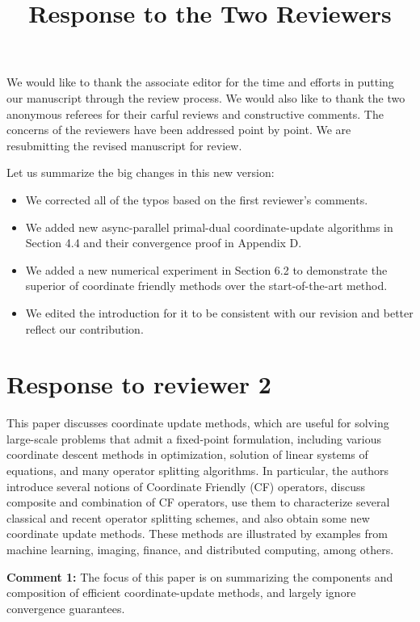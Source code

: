 \documentclass[amsa]{ipart}
\begin{document}
\title{Response to the Two Reviewers}
\vspace{5mm}

We would like to thank the associate editor for the time and efforts in putting our manuscript through the review process. We would also like to thank the two anonymous referees for their carful reviews and constructive comments. The concerns of the reviewers have been addressed point by point. We are resubmitting the revised manuscript for review. 

Let us summarize the big changes in this new version:
\begin{itemize}
\item We corrected all of the typos based on the first reviewer's comments. 
\item We added new async-parallel primal-dual coordinate-update algorithms in Section 4.4 and their convergence proof in Appendix D.
\item We added a new numerical experiment in Section 6.2 to demonstrate the superior of coordinate friendly methods over the start-of-the-art method. 
\item We edited the introduction for it to be consistent with our revision and better reflect our contribution.
\end{itemize}
\section{Response to reviewer 2}
This paper discusses coordinate update methods, which are useful for solving
large-scale problems that admit a fixed-point formulation, including various
coordinate descent methods in optimization, solution of linear systems of
equations, and many operator splitting algorithms. In particular, the authors
introduce several notions of Coordinate Friendly (CF) operators, discuss
composite and combination of CF operators, use them to characterize several
classical and recent operator splitting schemes, and also obtain some new
coordinate update methods. These methods are illustrated by examples from
machine learning, imaging, finance, and distributed computing, among others.

\textbf{Comment 1:} The focus of this paper is on summarizing the components and composition of
efficient coordinate-update methods, and largely ignore convergence guarantees.
\end{document}
